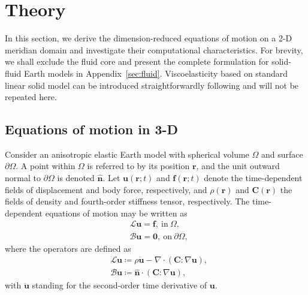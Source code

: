 \documentclass[extra,referee]{gji}
\begin{document}
\section{Theory}
\label{sec:theory}
In this section, we derive the dimension-reduced equations of motion
on a 2-D meridian domain and investigate their computational characteristics.
For brevity, we shall exclude the fluid core and present the complete 
formulation for solid-fluid Earth models in Appendix~\ref{sec:fluid}.
Viscoelasticity based on standard linear solid model can be introduced 
straightforwardly following \cite{van2014optimized} and will not be
repeated here.    

\subsection{Equations of motion in 3-D}
Consider an anisotropic elastic Earth model with spherical volume $\Omega$
and surface $\partial\Omega$. A point within $\Omega$ is referred
to by its position $\mathbf{r}$, and the unit outward normal
to $\partial\Omega$ is denoted $\hat{\mathbf{n}}$. 
Let $\mathbf{u}\left(\mathbf{r};t\right)$
and $\mathbf{f}\left(\mathbf{r};t\right)$ denote the time-dependent
fields of displacement and body force, respectively, 
and $\rho\left(\mathbf{r}\right)$
and $\mathbf{C}\left(\mathbf{r}\right)$ the fields of density and
fourth-order stiffness tensor, respectively. The 
time-dependent equations of motion may be written as
\begin{align}
  & \mathscr{L}\mathbf{u}=\mathbf{f},\ \text{in}\ \Omega,
  \label{eq:eom3d}\\[.5em]
  & \mathscr{B}\mathbf{u}=\mathbf{0},\ \text{on}\ \partial\Omega,
  \label{eq:surf3d}
\end{align}
where the operators are defined as
\begin{align}
  & \mathscr{L}\mathbf{u} \coloneqq \rho\ddot{\mathbf{u}}-
  \nabla\cdot\left(\mathbf{C}:\nabla\mathbf{u}\right),\\[.5em]
  & \mathscr{B}\mathbf{u} \coloneqq \hat{\mathbf{n}}\cdot
  \left(\mathbf{C}:\nabla\mathbf{u}\right),
\end{align}
with $\ddot{\mathbf{u}}$ standing for the second-order time 
derivative of $\mathbf{u}$.
\end{document}
